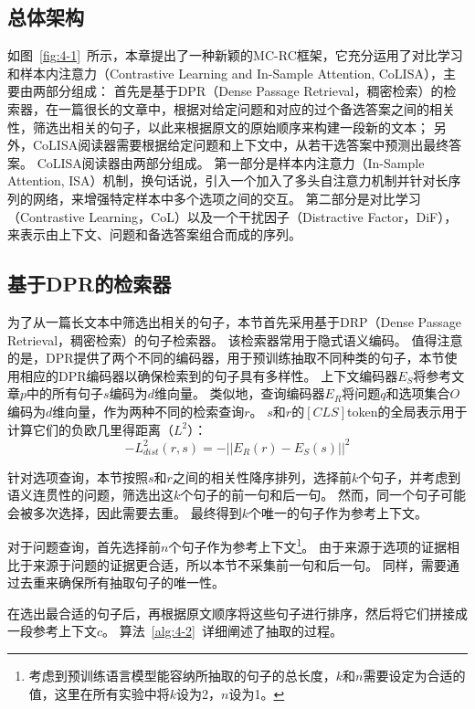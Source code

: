 \subsection{总体架构}
如图~\ref{fig:4-1}~所示，本章提出了一种新颖的MC-RC框架，它充分运用了对比学习和样本内注意力（Contrastive Learning and In-Sample Attention, CoLISA），主要由两部分组成：
首先是基于DPR（Dense Passage Retrieval，稠密检索）的检索器，在一篇很长的文章中，根据对给定问题和对应的过个备选答案之间的相关性，筛选出相关的句子，以此来根据原文的原始顺序来构建一段新的文本；
另外，CoLISA阅读器需要根据给定问题和上下文中，从若干选答案中预测出最终答案。
CoLISA阅读器由两部分组成。
第一部分是样本内注意力（In-Sample Attention, ISA）机制，换句话说，引入一个加入了多头自注意力机制并针对长序列的网络，来增强特定样本中多个选项之间的交互。
第二部分是对比学习（Contrastive Learning，CoL）以及一个干扰因子（Distractive Factor，DiF），来表示由上下文、问题和备选答案组合而成的序列。



\subsection{基于DPR的检索器}
为了从一篇长文本中筛选出相关的句子，本节首先采用基于DRP（Dense Passage Retrieval，稠密检索）的句子检索器。
该检索器常用于隐式语义编码\cite{karpukhin2020dense}。
值得注意的是，DPR提供了两个不同的编码器，用于预训练抽取不同种类的句子，本节使用相应的DPR编码器以确保检索到的句子具有多样性。
上下文编码器$E_S$将参考文章$p$中的所有句子$s$编码为$d$维向量。
类似地，查询编码器$E_R$将问题$q$和选项集合$O$编码为$d$维向量，作为两种不同的检索查询$r$。
$s$和$r$的$[CLS]$token的全局表示用于计算它们的负欧几里得距离（$L^2$）：
\begin{equation}
    -L^2_{dist}(r,s)=-||E_R(r)-E_S(s)||^2
\end{equation}

针对选项查询，本节按照$s$和$r$之间的相关性降序排列，选择前$k$个句子，并考虑到语义连贯性的问题，筛选出这$k$个句子的前一句和后一句。
然而，同一个句子可能会被多次选择，因此需要去重。
最终得到$k$个唯一的句子作为参考上下文。

对于问题查询，首先选择前$n$个句子作为参考上下文\footnote{考虑到预训练语言模型能容纳所抽取的句子的总长度，$k$和$n$需要设定为合适的值，这里在所有实验中将$k$设为2，$n$设为1。}。
由于来源于选项的证据相比于来源于问题的证据更合适，所以本节不采集前一句和后一句。
同样，需要通过去重来确保所有抽取句子的唯一性。

在选出最合适的句子后，再根据原文顺序将这些句子进行排序，然后将它们拼接成一段参考上下文$c$。
算法~\ref{alg:4-2}~详细阐述了抽取的过程。

